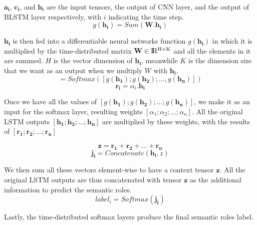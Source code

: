 $\mathbf{a_{i}}$, $\mathbf{c_{i}}$, and $\mathbf{h_{i}}$ are the input tensors, the output of CNN layer, and the output of BLSTM layer respectively, with $i$ indicating the time step. 
\begin{equation}
\label{sum_weight}
g(\mathbf{h_{i}}) = Sum(\mathbf{W}.\mathbf{h_{i}})
\end{equation}

$\mathbf{h_{i}}$ is then fed into a differentiable neural networks function $g(\mathbf{h_{i}})$ in which it is multiplied by the time-distributed matrix $\textbf{W} \in {\rm I\!R^{H \times K}}$ and all the elements in it are summed. $H$ is the vector dimension of $\mathbf{h_{i}}$, meanwhile $K$ is the dimension size that we want as an output when we multiply \textbf{$W$} with $\mathbf{h_{i}}$.
\begin{equation}
[\alpha_{1}, \alpha_{2}, ..., \alpha_{n}] = Softmax([g(\mathbf{h_{1}}); g(\mathbf{h_{2}}); ..., g(\mathbf{h_{n}})])
\end{equation}
\begin{equation}
\mathbf{r_{i}} = \alpha_{i}.\mathbf{h_{i}}
\end{equation}

Once we have all the values of $[g(\mathbf{h_{1}}); g(\mathbf{h_{2}}); ...; g(\mathbf{h_{n}})]$, we make it as an input for the softmax layer, resulting weights $[\alpha_{1}; \alpha_{2}; ...; \alpha_{n}]$. All the original LSTM outputs $[\mathbf{h_{1}}; \mathbf{h_{2}}; ...; \mathbf{h_{n}}]$ are multiplied by these weights, with the results of $[\mathbf{r_{1}}; \mathbf{r_{2}}; ...; \mathbf{r_{n}}]$


\begin{equation}
\mathbf{z} = \mathbf{r_{1}} + \mathbf{r_{2}} + ... + \mathbf{r_{n}}
\end{equation}
\begin{equation}
\mathbf{j_{i}} = Concatenate(\mathbf{h_{i}}, z)
\end{equation}

We then sum all these vectors element-wise to have a context tensor $\mathbf{z}$. 
All the original LSTM outputs are thus concatenated with tensor $\mathbf{z}$ as the additional information to predict the semantic roles.
\begin{equation}
label_{i} = Softmax(\mathbf{j_{i}})
\end{equation}

Lastly, the time-distributed softmax layers produce the final semantic roles label.

